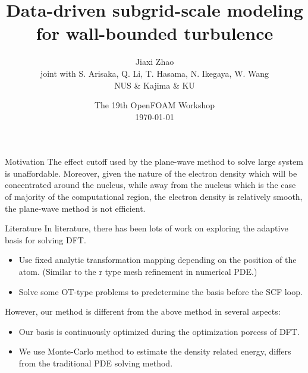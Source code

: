 \documentclass[paper slide]{beamer}
\title[Data-driven SGS modeling]{Data-driven subgrid-scale modeling for wall-bounded turbulence}
\author[J. Zhao]{Jiaxi Zhao \\ \small joint with S. Arisaka, Q. Li, T. Hasama, N. Ikegaya, W. Wang \\
\small NUS \& Kajima \& KU}
\date[\today]{The 19th OpenFOAM Workshop \\ \today}
\begin{document}
\par \setlength{\parindent}{2em}

\begin{frame}
\titlepage
\end{frame}

\begin{frame}{Motivation}
	The effect cutoff used by the plane-wave method to solve large system is
	unaffordable. Moreover, given the nature of the electron density which will
	be concentrated around the nucleus, while away from the nucleus which is the
	case of majority of the computational region, the electron density is
	relatively smooth, the plane-wave method is not efficient.

\end{frame}

\begin{frame}{Literature}
	In literature, there has been lots of work on exploring the adaptive basis for
	solving DFT. 
	\begin{itemize}
		\item Use fixed analytic transformation mapping depending on the position of the
		atom. (Similar to the r type mesh refinement in numerical PDE.)
		\item Solve some OT-type problems to predetermine the basis before the SCF
		loop.
	\end{itemize}
	However, our method is different from the above method in several aspects:
	\begin{itemize}
		\item Our basis is continuously optimized during the optimization porcess of
		DFT.
		\item We use Monte-Carlo method to estimate the density related energy,
		differs from the traditional PDE solving method.
	\end{itemize}
\end{frame}
\end{document}
